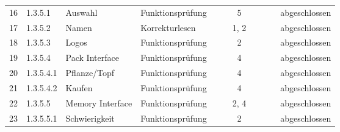 \begin{table}[H]
\begin{tabular}{|c|l|l|l|l|l|c|c|l|l|l|}
        16 & 1.3.5.1 & Auswahl & Funktionsprüfung &  &  & 5 &  &  &  & abgeschlossen \\
        17 & 1.3.5.2 & Namen & Korrekturlesen &  &  & 1, 2 &  &  &  & abgeschlossen \\
        18 & 1.3.5.3 & Logos & Funktionsprüfung &  &  & 2 &  &  &  & abgeschlossen \\
        19 & 1.3.5.4 & Pack Interface & Funktionsprüfung &  &  & 4 &  &  &  & abgeschlossen \\
        20 & 1.3.5.4.1 & Pflanze/Topf & Funktionsprüfung &  &  & 4 &  &  &  & abgeschlossen \\
        21 & 1.3.5.4.2 & Kaufen & Funktionsprüfung &  &  & 4 &  &  &  & abgeschlossen \\
        22 & 1.3.5.5 & Memory Interface & Funktionsprüfung &  &  & 2, 4 &  &  &  & abgeschlossen \\
        23 & 1.3.5.5.1 & Schwierigkeit & Funktionsprüfung &  &  & 2 &  &  &  & abgeschlossen \\
        \hline
    \end{tabular}
\end{table}
